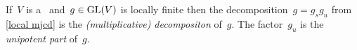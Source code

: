 %   
%   
%   


\begin{definition}
  If~$V$ is a~ and~$g \in \operatorname{GL}(V)$ is locally finite then the decomposition~$g = g_s g_u$ from \cref{local mjcd} is the \emph{\textup(multiplicative\textup) {\JCD} decompositon} of~$g$.
  The factor~$g_u$ is the \emph{unipotent part} of~$g$.
\end{definition}


